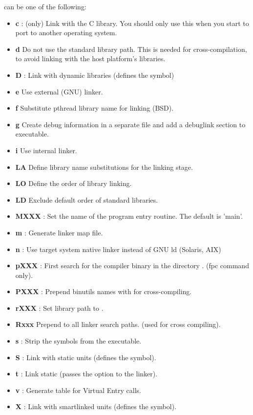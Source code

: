 \begin{description}
can be one of the following:
\begin{itemize}
\item \textbf{c} : (\linux only) Link with the C library. You should only use this when
  you start to port \fpc to another operating system. 
\item \textbf{d} Do not use the standard library path. This is needed for
cross-compilation, to avoid linking with the host platform's libraries.
\item \textbf{D} : Link with dynamic libraries (defines the
 symbol) 
\item \textbf{e} Use external (GNU) linker.
\item \textbf{f}  Substitute pthread library name for linking (BSD).
\item \textbf{g} Create debug information in a separate file and add a debuglink section to executable.
\item \textbf{i} Use internal linker.
\item \textbf{LA}  Define library name substitutions for the linking stage.
\item \textbf{LO}  Define the order of library linking.
\item \textbf{LD}  Exclude default order of standard libraries.
 \item \textbf{MXXX} : Set the name of the program entry routine.
The default is 'main'.
\item \textbf{m} : Generate linker map file.
\item \textbf{n} : Use target system native linker instead of GNU ld (Solaris, AIX)
\item \textbf{pXXX} :   First search for the compiler binary in the directory .  (fpc command only).
\item \textbf{PXXX} : Prepend binutils names with   for cross-compiling.
\item \textbf{rXXX} : Set library path to .
\item \textbf{Rxxx} Prepend  to all linker search paths. (used for
cross compiling).
\item \textbf{s} : Strip the symbols from the executable. 
\item \textbf{S} : Link with static units (defines the  symbol).
\item \textbf{t} : Link static (passes the  option to the linker). 
\item \textbf{v} : Generate table for Virtual Entry calls.
\item \textbf{X} : Link with smartlinked units (defines the  symbol). 
\end{itemize}
\end{description}

